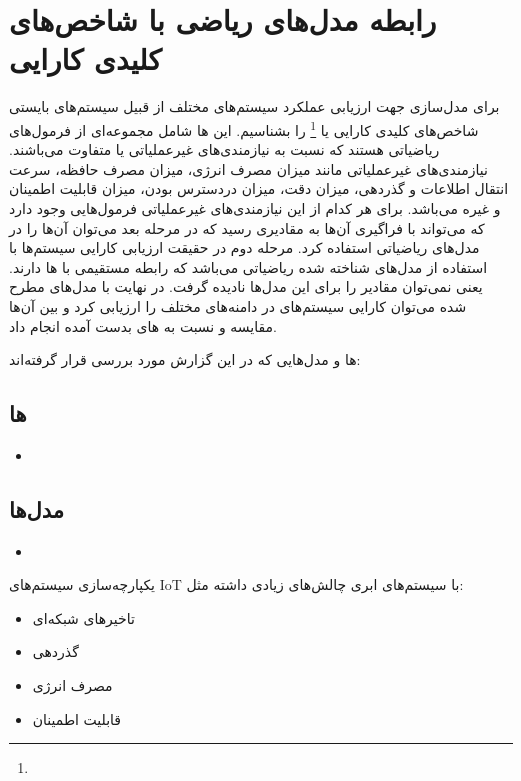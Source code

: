 \section{رابطه مدل‌های ریاضی با شاخص‌های کلیدی کارایی}

برای مدل‌سازی جهت ارزیابی عملکرد سیستم‌های مختلف از قبیل سیستم‌های 
بایستی شاخص‌های کلیدی کارایی یا  \footnote{} را بشناسیم. این ها شامل مجموعه‌ای از فرمول‌های ریاضیاتی
هستند که نسبت به نیازمندی‌های غیرعملیاتی یا 
متفاوت می‌باشند. نیازمندی‌های غیرعملیاتی مانند میزان مصرف انرژی، میزان مصرف
حافظه، سرعت انتقال اطلاعات و گذردهی، میزان دقت، میزان دردسترس بودن، میزان قابلیت
اطمینان و غیره می‌باشد. برای هر کدام از این نیازمندی‌های غیرعملیاتی فرمول‌هایی
وجود دارد که می‌تواند با فراگیری آن‌ها به مقادیری رسید که در مرحله بعد می‌توان
آن‌ها را در مدل‌های ریاضیاتی استفاده کرد.  مرحله دوم در حقیقت ارزیابی کارایی
سیستم‌ها با استفاده از مدل‌های شناخته شده ریاضیاتی می‌باشد که رابطه مستقیمی با
‌ها دارند. یعنی ‌نمی‌توان مقادیر  را برای این مدل‌ها نادیده
گرفت. در نهایت با مدل‌های مطرح شده می‌توان کارایی سیستم‌های  در
دامنه‌های مختلف را ارزیابی کرد و بین آن‌ها مقایسه و  نسبت به
های بدست آمده انجام داد.

ها و مدل‌هایی که در این گزارش مورد بررسی قرار گرفته‌اند:

\subsection{ها}

\begin{itemize}
    \item 
\end{itemize}

\subsection{مدل‌ها}

\begin{itemize}
    \item 
\end{itemize}

یکپارچه‌سازی سیستم‌های IoT با سیستم‌های ابری چالش‌های زیادی داشته مثل:

\begin{itemize}
    \item تاخیر‌های شبکه‌ای
    \item گذردهی
    \item مصرف انرژی
    \item قابلیت اطمینان
\end{itemize}

